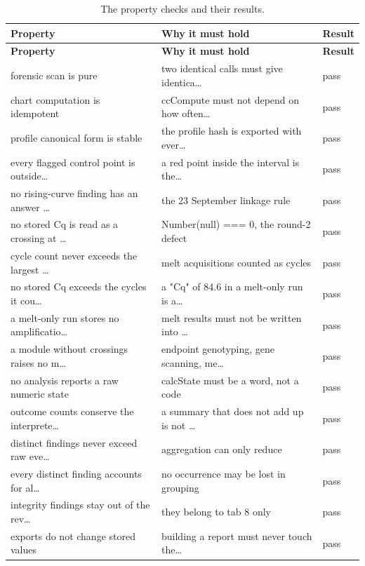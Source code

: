 {\small
\begin{xltabular}{\linewidth}{|X|l|l|}
\caption{The property checks and their results.}\label{tab:val-invariants} \\
\toprule \textbf{Property} & \textbf{Why it must hold} & \textbf{Result} \\\midrule\endfirsthead
\toprule \textbf{Property} & \textbf{Why it must hold} & \textbf{Result} \\\midrule\endhead
forensic scan is pure & two identical calls must give identica… & pass \\
chart computation is idempotent & ccCompute must not depend on how often… & pass \\
profile canonical form is stable & the profile hash is exported with ever… & pass \\
every flagged control point is outside… & a red point inside the interval is the… & pass \\
no rising-curve finding has an answer … & the 23 September linkage rule & pass \\
no stored Cq is read as a crossing at … & Number(null) === 0, the round-2 defect & pass \\
cycle count never exceeds the largest … & melt acquisitions counted as cycles & pass \\
no stored Cq exceeds the cycles it cou… & a "Cq" of 84.6 in a melt-only run is a… & pass \\
a melt-only run stores no amplificatio… & melt results must not be written into … & pass \\
a module without crossings raises no m… & endpoint genotyping, gene scanning, me… & pass \\
no analysis reports a raw numeric state & calcState must be a word, not a code & pass \\
outcome counts conserve the interprete… & a summary that does not add up is not … & pass \\
distinct findings never exceed raw eve… & aggregation can only reduce & pass \\
every distinct finding accounts for al… & no occurrence may be lost in grouping & pass \\
integrity findings stay out of the rev… & they belong to tab 8 only & pass \\
exports do not change stored values & building a report must never touch the… & pass \\
\bottomrule
\end{xltabular}}

